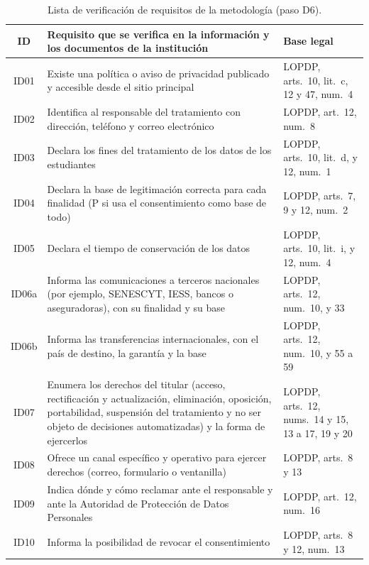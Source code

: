 \begin{table}[htbp]
  \centering
  \caption{Lista de verificación de requisitos de la metodología (paso D6).}
  \label{tab:lista_verificacion}
  \scriptsize
  \renewcommand{\arraystretch}{1.15}
  \begin{tabularx}{\textwidth}{|c|L|>{\raggedright\arraybackslash}p{3.6cm}|}
    \hline
    \textbf{ID} & \textbf{Requisito que se verifica en la información y los documentos de la institución} & \textbf{Base legal} \\
    \hline
    ID01 & Existe una política o aviso de privacidad publicado y accesible desde el sitio principal & LOPDP, arts.~10, lit.~c, 12 y 47, num.~4 \\
    \hline
    ID02 & Identifica al responsable del tratamiento con dirección, teléfono y correo electrónico & LOPDP, art.~12, num.~8 \\
    \hline
    ID03 & Declara los fines del tratamiento de los datos de los estudiantes & LOPDP, arts.~10, lit.~d, y 12, num.~1 \\
    \hline
    ID04 & Declara la base de legitimación correcta para cada finalidad (P si usa el consentimiento como base de todo) & LOPDP, arts.~7, 9 y 12, num.~2 \\
    \hline
    ID05 & Declara el tiempo de conservación de los datos & LOPDP, arts.~10, lit.~i, y 12, num.~4 \\
    \hline
    ID06a & Informa las comunicaciones a terceros nacionales (por ejemplo, SENESCYT, IESS, bancos o aseguradoras), con su finalidad y su base & LOPDP, arts.~12, num.~10, y 33 \\
    \hline
    ID06b & Informa las transferencias internacionales, con el país de destino, la garantía y la base & LOPDP, arts.~12, num.~10, y 55 a 59 \\
    \hline
    ID07 & Enumera los derechos del titular (acceso, rectificación y actualización, eliminación, oposición, portabilidad, suspensión del tratamiento y no ser objeto de decisiones automatizadas) y la forma de ejercerlos & LOPDP, arts.~12, nums.~14 y 15, 13 a 17, 19 y 20 \\
    \hline
    ID08 & Ofrece un canal específico y operativo para ejercer derechos (correo, formulario o ventanilla) & LOPDP, arts.~8 y 13 \\
    \hline
    ID09 & Indica dónde y cómo reclamar ante el responsable y ante la Autoridad de Protección de Datos Personales & LOPDP, art.~12, num.~16 \\
    \hline
    ID10 & Informa la posibilidad de revocar el consentimiento & LOPDP, arts.~8 y 12, num.~13 \\

\end{tabularx}
\end{table}
